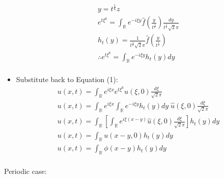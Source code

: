 \documentclass[12pt, a4paper]{article}
\begin{document}
\begin{itemize}
    \begin{gather*}
        y = t^{\frac{1}{6}}z\\
        e^{t\xi^6} = \int_{\mathbb{R}} e^{-i\xi y}\hat{f}\left(\frac{y}{t^\frac{1}{6}}\right)\frac{dy}{t^\frac{1}{6}\sqrt{2}\pi}\\
        h_t(y) = \frac{1}{t^\frac{1}{6}\sqrt{2}\pi}\hat{f}\left(\frac{y}{t^\frac{1}{6}}\right)\\
        \therefore e^{t\xi^6} = \int_{\mathbb{R}} e^{-i\xi y}h_t(y)dy\\
    \end{gather*}
    \item Substitute back to Equation (1):
    \begin{gather*}
        u(x, t) = \int_{\mathbb{R}} e^{i\xi x}e^{t\xi^6}\hat{u}(\xi, 0)\frac{d\xi}{\sqrt{2}\pi} \\ 
        u(x, t) = \int_{\mathbb{R}} e^{i\xi x}\int_{\mathbb{R}} e^{-i\xi y}h_t(y)dy\;\hat{u}(\xi, 0)\frac{d\xi}{\sqrt{2}\pi}\\
        u(x, t) = \int_{\mathbb{R}} \left[\int_{\mathbb{R}} e^{i\xi (x-y)}\hat{u}(\xi, 0)\frac{d\xi}{\sqrt{2}\pi}\right]h_t(y)dy\\
        u(x, t) = \int_{\mathbb{R}} u(x-y, 0) h_t(y)dy\\
        u(x, t) = \int_{\mathbb{R}} \phi(x-y) h_t(y)dy\\
    \end{gather*}
\end{itemize}
Periodic case:
\end{document}
